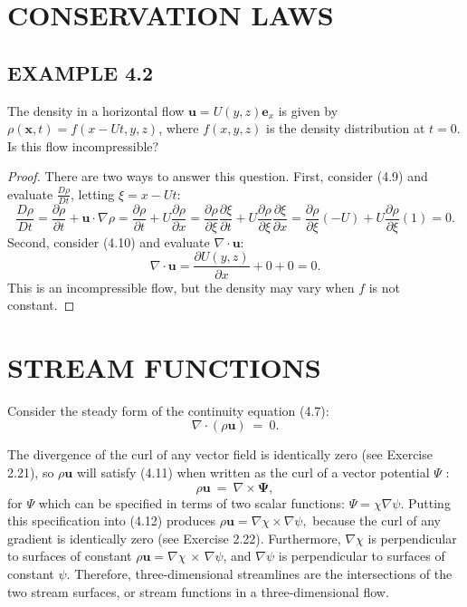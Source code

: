 \documentclass{article}
\begin{document}
\section{CONSERVATION LAWS}
\subsection{EXAMPLE 4.2}

The density in a horizontal flow $\mathbf{u}=U(y,z)\mathbf{e}_x$ is given by $\rho(\mathbf{x}, t)=f(x-Ut,y,z)$, where $f(x,y,z)$ is the density distribution at $t=0$. Is this flow incompressible?

\begin{proof}
There are two ways to answer this question. First, consider (4.9) and evaluate $\frac{D\rho}{Dt}$, letting $\xi=x-Ut$:
$$
\frac{D\rho}{Dt}=\frac{\partial\rho}{\partial t}+\mathbf{u}\cdot\nabla\rho=\frac{\partial\rho}{\partial t}+U\frac{\partial\rho}{\partial x}=\frac{\partial\rho}{\partial\xi}\frac{\partial\xi}{\partial t}+U\frac{\partial\rho}{\partial\xi}\frac{\partial\xi}{\partial x}=\frac{\partial\rho}{\partial\xi}(-U)+U\frac{\partial\rho}{\partial\xi}(1)=0.
$$
Second, consider (4.10) and evaluate $\nabla\cdot\mathbf{u}$:
$$
\nabla\cdot\mathbf{u}=\frac{\partial U(y,z)}{\partial x}+0+0=0.
$$
This is an incompressible flow, but the density may vary when $f$ is not constant.

\end{proof}

\section{STREAM FUNCTIONS}

Consider the steady form of the continuity equation (4.7):
$$
\nabla\cdot(\rho\mathbf{u}) ~=~ 0. \tag{4.11}
$$

The divergence of the curl $\mathrm{o f}$ any vector field is identically zero (see Exercise 2.21), so $\rho\mathbf{u}$ will satisfy (4.11) when written as the curl of a vector potential $\Psi$ :
$$
\rho\mathbf{u} ~=~ \nabla\times\mathbf{\Psi}, \tag{4.12}
$$
for $\Psi$ which can be specified in terms of two scalar functions: $\Psi=\chi\nabla\psi.$  Putting this specification into (4.12) produces $\rho\mathbf{u}=\nabla\chi\times\nabla\psi,$ because the curl of any gradient is identically zero (see Exercise 2.22). Furthermore, $\nabla\chi$ is perpendicular to surfaces of constant $\rho\mathbf{u}=\nabla\chi\, \times\, \nabla\psi$, and $\nabla\psi$ is perpendicular to surfaces of constant $\psi$. Therefore, three-dimensional streamlines are the intersections of the two stream surfaces, or stream functions in a three-dimensional flow.
\end{document}
